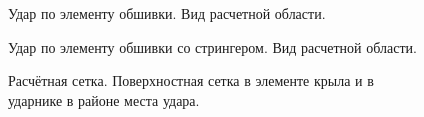 \begin{figure}[htp]
\caption{Удар по элементу обшивки. Вид расчетной области.}
\label{pic:wing_only_scene}
\end{figure}

\begin{figure}[htp]
\caption{Удар по элементу обшивки со стрингером. Вид расчетной области.}
\label{pic:wing_stringer_scene}
\end{figure}

\begin{figure}[htp]
\caption{Расчётная сетка. Поверхностная сетка в элементе крыла и в ударнике в районе места удара.}
\label{pic:wing_mesh_sample}
\end{figure}


